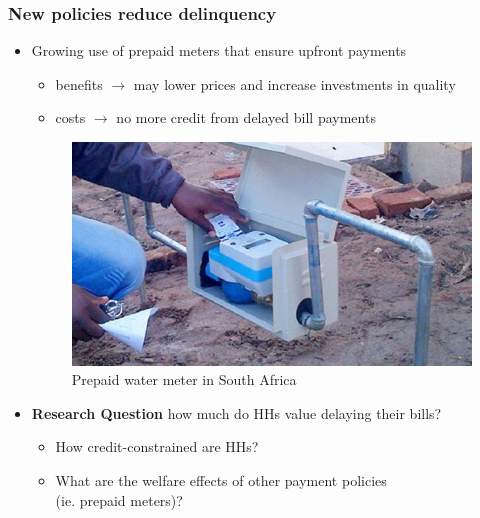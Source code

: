 \documentclass[aspectratio=149]{beamer}
\begin{document}
\begin{frame}
\frametitle{ New policies reduce delinquency }


\begin{itemize}
  \item Growing use of prepaid meters that ensure upfront payments
  \vspace{.1cm}
  \begin{itemize}
    \item benefits $\rightarrow$ may lower prices and increase investments in quality
    \item costs $\rightarrow$ no more credit from delayed bill payments
  \end{itemize}
\begin{figure}
\centering
\caption{Prepaid water meter in South Africa}
\includegraphics[scale=.2]{prepaid-water-meter.jpg}
\end{figure}
\end{itemize}

\begin{itemize}
\item \textbf{Research Question} \hspace{.5mm} how much do HHs value delaying their bills?
\vspace{.1cm}
\begin{itemize}
  \item How credit-constrained are HHs?
  \item What are the welfare effects of other payment policies \\ (ie. prepaid meters)?
\end{itemize}
\end{itemize}



\end{frame}
\end{document}
